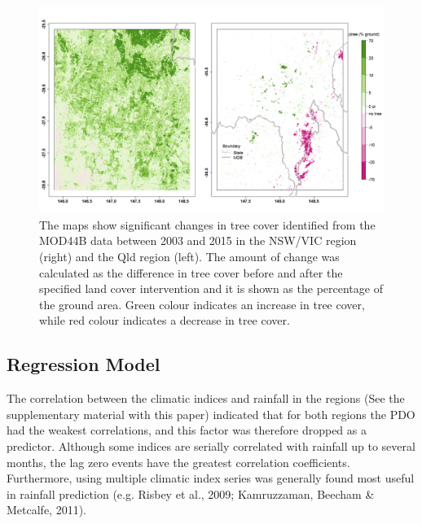 \documentclass[fleqn,10pt,lineno]{wlpeerj} %
\theoremstyle{definition}
\theoremstyle{definition}
\theoremstyle{definition}
\theoremstyle{remark}
\begin{document}
\begin{figure}
\includegraphics[width=0.9\linewidth]{figures/tc_figs} \caption{The maps show significant changes in tree cover identified from the MOD44B data between 2003 and 2015 in the NSW/VIC region (right) and the Qld region (left). The amount of change was calculated as the difference in tree cover before and after the specified land cover intervention and it is shown as the percentage of the ground area. Green colour indicates an increase in tree cover, while red colour indicates a decrease in tree cover.}\label{fig:tctrend}
\end{figure}

\subsection{Regression Model}\label{regression-model}

The correlation between the climatic indices and rainfall in the regions
(See the supplementary material with this paper) indicated that for both
regions the PDO had the weakest correlations, and this factor was
therefore dropped as a predictor. Although some indices are serially
correlated with rainfall up to several months, the lag zero events have
the greatest correlation coefficients. Furthermore, using multiple
climatic index series was generally found most useful in rainfall
prediction (e.g. Risbey et al., 2009; Kamruzzaman, Beecham \& Metcalfe,
2011).
\end{document}

